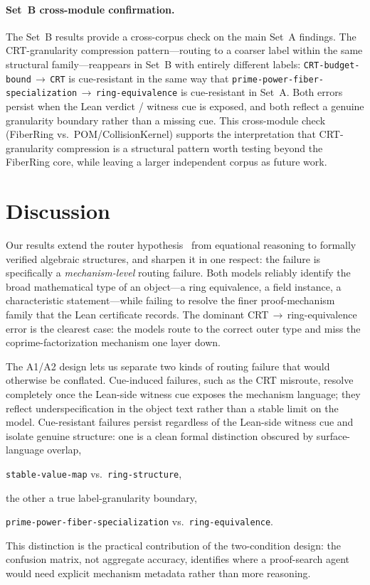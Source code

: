 \documentclass[11pt]{article}
\begin{document}
\paragraph{Set~B cross-module confirmation.}
The Set~B results provide a cross-corpus check on the main Set~A findings.
The CRT-granularity compression pattern---routing to a coarser label within
the same structural family---reappears in Set~B with entirely different
labels: \texttt{CRT{-}budget{-}bound}\,$\to$\,\texttt{CRT} is cue-resistant
in the same way that
\texttt{prime{-}power{-}fiber{-}specialization}\,$\to$\,\texttt{ring{-}equivalence}
is cue-resistant in Set~A.
Both errors persist when the Lean verdict / witness cue is exposed, and both
reflect a genuine granularity boundary rather than a missing cue.
This cross-module check (FiberRing vs.\ POM/CollisionKernel) supports the
interpretation that CRT-granularity compression is a structural pattern worth
testing beyond the FiberRing core, while leaving a larger independent corpus
as future work.

\section{Discussion}
\label{sec:discussion}

Our results extend the router hypothesis~\citep{sair2026} from equational
reasoning to formally verified algebraic structures, and sharpen it in one
respect: the failure is specifically a \emph{mechanism-level} routing
failure.
Both models reliably identify the broad mathematical type of an object---a
ring equivalence, a field instance, a characteristic statement---while
failing to resolve the finer proof-mechanism family that the Lean
certificate records.
The dominant CRT\,$\to$\,ring-equivalence error is the clearest case: the
models route to the correct outer type and miss the coprime-factorization
mechanism one layer down.

The A1/A2 design lets us separate two kinds of routing failure that would
otherwise be conflated.
Cue-induced failures, such as the CRT misroute, resolve completely once the
Lean-side witness cue exposes the mechanism language; they reflect
underspecification in the object text rather than a stable limit on the model.
Cue-resistant failures persist regardless of the Lean-side witness cue
and isolate genuine structure: one is a clean formal distinction obscured by
surface-language overlap,
\begin{center}
\texttt{stable-value-map} vs.\ \texttt{ring-structure},
\end{center}
the other a true label-granularity boundary,
\begin{center}
\texttt{prime-power-fiber-specialization} vs.\ \texttt{ring-equivalence}.
\end{center}
This distinction is the practical contribution of the two-condition design:
the confusion matrix, not aggregate accuracy, identifies where a proof-search
agent would need explicit mechanism metadata rather than more reasoning.
\end{document}
